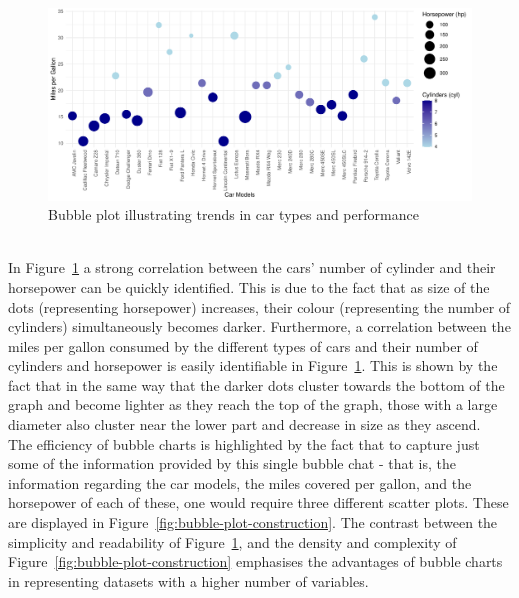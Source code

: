 \documentclass{article}\usepackage[]{graphicx}\usepackage[]{xcolor}
\makeatletter
\def\maxwidth{ %
  \ifdim\Gin@nat@width>\linewidth
    \linewidth
  \else
    \Gin@nat@width
  \fi
}
\newenvironment{knitrout}{}{} %
\numberwithin{equation}{section}
\makeatother
\begin{document}
\begin{knitrout}\scriptsize
{}\color{fgcolor}\begin{figure}[H]

{\centering \includegraphics[width=\maxwidth]{figure/beamer-bubble-plot-1} 

}

\caption[Bubble plot illustrating trends in car types and performance]{Bubble plot illustrating trends in car types and performance}\label{fig:bubble-plot}
\end{figure}

\end{knitrout}

\\\noindent In Figure~\ref{fig:bubble-plot} a strong correlation between the cars' number of cylinder and their horsepower can be quickly identified. This is due to the fact that as size of the dots (representing horsepower) increases, their colour (representing the number of cylinders) simultaneously becomes darker. Furthermore, a correlation between the miles per gallon consumed by the different types of cars and their number of cylinders and horsepower is easily identifiable in Figure~\ref{fig:bubble-plot}. This is shown by the fact that in the same way that the darker dots cluster towards the bottom of the graph and become lighter as they reach the top of the graph, those with a large diameter also cluster near the lower part and decrease in size as they ascend. \\ 

\noindent 
The efficiency of bubble charts is highlighted by the fact that to capture just some of the information provided by this single bubble chat - that is, the information regarding the car models, the miles covered per gallon, and the horsepower of each of these, one would require three different scatter plots. These are displayed in Figure~\ref{fig:bubble-plot-construction}. The contrast between the simplicity and readability of Figure~\ref{fig:bubble-plot}, and the density and complexity of Figure~\ref{fig:bubble-plot-construction} emphasises the advantages of bubble charts in representing datasets with a higher number of variables. 
\end{document}
